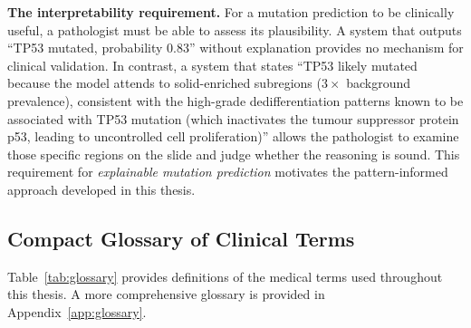 \textbf{The interpretability requirement.}
For a mutation prediction to be clinically useful, a pathologist must be able to assess its plausibility.
A system that outputs ``TP53 mutated, probability 0.83'' without explanation provides no mechanism for clinical validation.
In contrast, a system that states ``TP53 likely mutated because the model attends to solid-enriched subregions ($3\times$ background prevalence), consistent with the high-grade dedifferentiation patterns known to be associated with TP53 mutation (which inactivates the tumour suppressor protein p53, leading to uncontrolled cell proliferation)'' allows the pathologist to examine those specific regions on the slide and judge whether the reasoning is sound.
This requirement for \emph{explainable mutation prediction} motivates the pattern-informed approach developed in this thesis.


\subsection{Compact Glossary of Clinical Terms}
\label{sec:uc:glossary}

Table~\ref{tab:glossary} provides definitions of the medical terms used throughout this thesis.
A more comprehensive glossary is provided in Appendix~\ref{app:glossary}.

